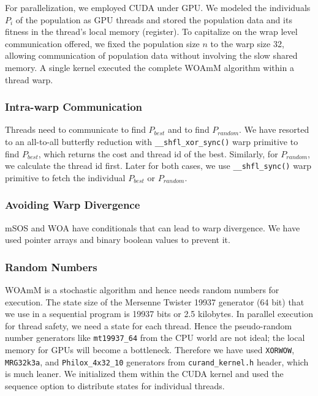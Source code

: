 \documentclass[conference]{IEEEtran}
\begin{document}
For parallelization, we employed CUDA under GPU. 
We modeled the individuals $P_i$ of the population as GPU threads and stored the population data and its fitness in the thread’s local memory (register). 
To capitalize on the wrap level communication offered, we fixed the population size $n$ to the warp size 32, allowing communication of population data without involving the slow shared memory. 
A single kernel executed the complete WOAmM algorithm within a thread warp.

\subsubsection{Intra-warp Communication}

Threads need to communicate to find $P_{best}$ and to find $P_{random}$. 
We have resorted to an all-to-all butterfly reduction with \lstinline{__shfl_xor_sync()} warp primitive to find $P_{best}$, which returns the cost and thread id of the best. 
Similarly, for $P_{random}$, we calculate the thread id first. 
Later for both cases, we use \lstinline{__shfl_sync()} warp primitive to fetch the individual $P_{best}$ or $P_{random}$.

\subsubsection{Avoiding Warp Divergence}

mSOS and WOA have conditionals that can lead to warp divergence. 
We have used pointer arrays and binary boolean values to prevent it.

\subsubsection{Random Numbers}

WOAmM is a stochastic algorithm and hence needs random numbers for execution. 
The state size of the Mersenne Twister 19937 generator (64 bit) that we use in a sequential program is 19937 bits or 2.5 kilobytes. 
In parallel execution for thread safety, we need a state for each thread. 
Hence the pseudo-random number generators like \lstinline{mt19937_64} from the CPU world are not ideal; the local memory for GPUs will become a bottleneck. 
Therefore we have used \lstinline{XORWOW}, \lstinline{MRG32k3a}, and \lstinline{Philox_4x32_10} generators from \lstinline{curand_kernel.h} header, which is much leaner. 
We initialized them within the CUDA kernel and used the sequence option to distribute states for individual threads.
\end{document}
